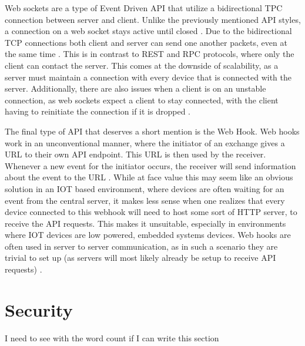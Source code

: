 Web sockets are a type of Event Driven API that utilize a bidirectional TPC connection between server and client. Unlike the previously mentioned API styles, a connection on a web socket stays active until closed \cite{WebsocketStandard}. Due to the bidirectional TCP connections both client and server can send one another packets, even at the same time \cite{DesigningWebApis}. This is in contrast to REST and RPC protocols, where only the client can contact the server. This comes at the downside of scalability, as a server must maintain a connection with every device that is connected with the server. Additionally, there are also issues when a client is on an unstable connection, as web sockets expect a client to stay connected, with the client having to reinitiate the connection if it is dropped \cite{DesigningWebApis}.

The final type of API that deserves a short mention is the Web Hook. Web hooks work in an unconventional manner, where the initiator of an exchange gives a URL to their own API endpoint. This URL is then used by the receiver. Whenever a new event for the initiator occurs, the receiver will send information about the event to the URL \cite{DesigningWebApis}. While at face value this may seem like an obvious solution in an IOT based environment, where devices are often waiting for an event from the central server, it makes less sense when one realizes that every device connected to this webhook will need to host some sort of HTTP server, to receive the API requests. This makes it unsuitable, especially in environments where IOT devices are low powered, embedded systems devices. Web hooks are often used in server to server communication, as in such a scenario they are trivial to set up (as servers will most likely already be setup to receive API requests) \cite{DesigningWebApis}.

\section{Security} \label{sec:chap2:security}
I need to see with the word count if I can write this section 

